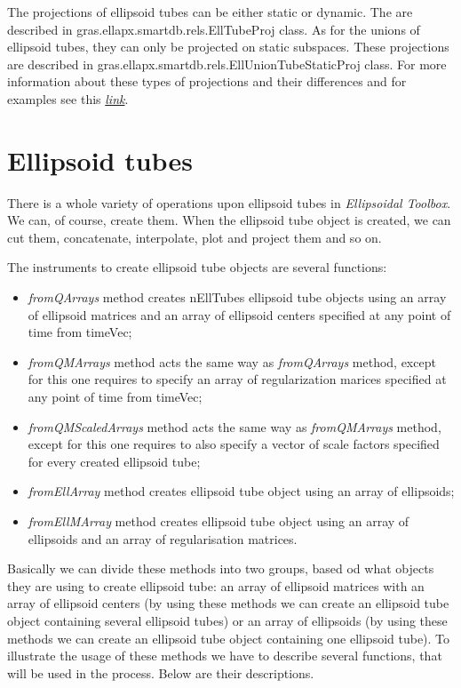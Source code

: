 \documentclass[letterpaper,10pt,english]{sphinxmanual}
\begin{document}
The projections of ellipsoid tubes can be either static or dynamic. The are described in gras.ellapx.smartdb.rels.EllTubeProj class. As for the unions of ellipsoid tubes, they can only be projected on static subspaces. These projections are described in gras.ellapx.smartdb.rels.EllUnionTubeStaticProj class. For more information about these types of projections and their differences and for examples see this {\hyperref[chap_implement:section-label]{\emph{link}}}.


\section{Ellipsoid tubes}
\label{chap_ellTube:ellipsoid-tubes}
There is a whole variety of operations upon ellipsoid tubes in \emph{Ellipsoidal Toolbox}. We can, of course, create them. When the ellipsoid tube object is created, we can cut them, concatenate, interpolate, plot and project them and so on.

The instruments to create ellipsoid tube objects are several functions:
\begin{itemize}
\item {} 
\emph{fromQArrays} method creates nEllTubes ellipsoid tube objects using an array of ellipsoid matrices and an array of ellipsoid centers specified at any point of time from timeVec;

\item {} 
\emph{fromQMArrays} method acts the same way as \emph{fromQArrays} method, except for this one requires to specify an array of regularization marices specified at any point of time from timeVec;

\item {} 
\emph{fromQMScaledArrays} method acts the same way as \emph{fromQMArrays} method, except for this one requires to also specify a vector of scale factors specified for every created ellipsoid tube;

\item {} 
\emph{fromEllArray} method creates ellipsoid tube object using an array of ellipsoids;

\item {} 
\emph{fromEllMArray} method creates ellipsoid tube object using an array of ellipsoids and an array of regularisation matrices.

\end{itemize}

Basically we can divide these methods into two groups, based od what objects they are using to create ellipsoid tube: an array of ellipsoid matrices with an array of ellipsoid centers (by using these methods we can create an ellipsoid tube object containing several ellipsoid tubes) or an array of ellipsoids (by using these methods we can create an ellipsoid tube object containing one ellipsoid tube). To illustrate the usage of these methods we have to describe several functions, that will be used in the process. Below are their descriptions.
\end{document}
